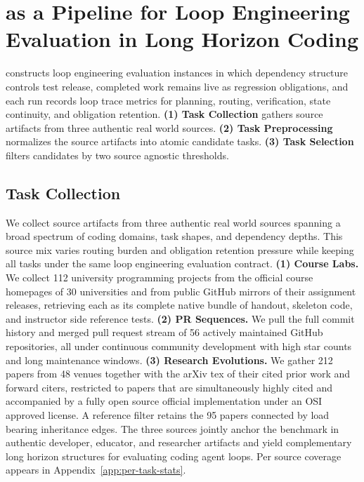\vspace{-4pt}
\section{\lhb{} as a Pipeline for Loop Engineering Evaluation in Long Horizon Coding}\label{sec:design}

 \lhb{} constructs loop engineering evaluation instances in which dependency structure controls test release, completed work remains live as regression obligations, and each run records loop trace metrics for planning, routing, verification, state continuity, and obligation retention. \textbf{(1) Task Collection} gathers source artifacts from three authentic real world sources. \textbf{(2) Task Preprocessing} normalizes the source artifacts into atomic candidate tasks. \textbf{(3) Task Selection} filters candidates by two source agnostic thresholds.

\vspace{-3pt}
\subsection{Task Collection}\label{sec:task-collection}



We collect source artifacts from three authentic real world sources spanning a broad spectrum of coding domains, task shapes, and dependency depths. This source mix varies routing burden and obligation retention pressure while keeping all tasks under the same loop engineering evaluation contract. \textbf{(1) Course Labs.} We collect 112 university programming projects from the official course homepages of 30 universities and from public GitHub mirrors of their assignment releases, retrieving each as its complete native bundle of handout, skeleton code, and instructor side reference tests. \textbf{(2) PR Sequences.} We pull the full commit history and merged pull request stream of 56 actively maintained GitHub repositories, all under continuous community development with high star counts and long maintenance windows. \textbf{(3) Research Evolutions.} We gather 212 papers from 48 venues together with the arXiv tex of their cited prior work and forward citers, restricted to papers that are simultaneously highly cited and accompanied by a fully open source official implementation under an OSI approved license. A reference filter retains the 95 papers connected by load bearing inheritance edges.
The three sources jointly anchor the benchmark in authentic developer, educator, and researcher artifacts and yield complementary long horizon structures for evaluating coding agent loops. Per source coverage appears in Appendix~\ref{app:per-task-stats}.

